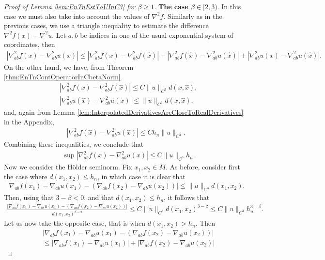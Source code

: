 \documentclass[11pt,reqno]{amsart}
\numberwithin{equation}{section}
\theoremstyle{plain}
\begin{document}
\begin{proof}[Proof of Lemma \ref{lem:EnTnEstToUInC3} for $\beta \geq 1$]
  \noindent \textbf{The case $\beta \in [2,3)$}. In this case we must also take into account the values of $\nabla^2f$. Similarly as in the previous cases, we use a triangle inequality to estimate the difference $\nabla^2 f(x)-\nabla^2 u$. Let $a,b$ be indices in one of the usual exponential system of coordinates, then
  \begin{align*}
    |\nabla_{ab}^2 f(x)-\nabla_{ab}^2 u(x)|\leq |\nabla_{ab}^2 f(x)-\nabla_{ab}^2 f(\hat x)|+|\nabla_{ab}^2 f(\hat x)-\nabla_{ab}^2 u(\hat x)|+|\nabla_{ab}^2 u(x)-\nabla_{ab}^2 u(\hat x)|.
  \end{align*}
  On the other hand, we have, from Theorem \ref{thm:EnTnContOperatorInCbetaNorm}
  \begin{align*}
    & |\nabla_{ab}^2 f(x)-\nabla_{ab}^2 f(\hat x)| \leq  C\|u\|_{C^3}d(x,\hat x),\\
    &  |\nabla_{ab}^2 u(\hat x) -\nabla_{ab}^2 u(x)| \leq \|u\|_{C^3}d(x,\hat x),
  \end{align*}
  and, again from Lemma \ref{lem:InterpolatedDerivativesAreCloseToRealDerivatives} in the Appendix, 
  \begin{align*}
    |\nabla_{ab}^2 f(\hat x)-\nabla_{ab}^2 u(\hat x)|\leq Ch_n\|u\|_{C^3}.
  \end{align*}  
  Combining these inequalities, we conclude that
  \begin{align*}
    & \sup |\nabla_{ab}^2 f(x)-\nabla_{ab}^2 u(x)|\leq C\|u\|_{C^3}h_n.
  \end{align*}
  Now we consider the H\"older seminorm. Fix $x_1,x_2\in M$. As before, consider first the case where $d(x_1,x_2)\leq h_n$, in which case it is clear that
  \begin{align*}
    |\nabla_{ab} f(x_1)-\nabla_{ab} u(x_1)-(\nabla_{ab} f(x_2)-\nabla_{ab} u(x_2))| \leq \|u\|_{C^3}d(x_1,x_2).
  \end{align*} 	  
  Then, using that $3-\beta<0$, and that $d(x_1,x_2) \leq h_n$, it follows that 
  \begin{align*}
    \frac{|\nabla_{ab} f(x_1)-\nabla_{ab} u(x_1)-(\nabla_{ab} f(x_2)-\nabla_{ab} u(x_2))|}{d(x_1,x_2)^{\beta-2}}  \leq C\|u\|_{C^3}d(x_1,x_2)^{3-\beta}\leq C\|u\|_{C^3}h_n^{3-\beta}.	 		
  \end{align*} 	  
  Let us now take the opposite case, that is when $d(x_1,x_2)>h_n$. Then
  \begin{align*}
    & |\nabla_{ab} f(x_1)-\nabla_{ab} u(x_1)-(\nabla_{ab} f(x_2)-\nabla_{ab} u(x_2))|\\
    & \leq |\nabla_{ab} f(x_1)-\nabla_{ab} u(x_1)|+|\nabla_{ab} f(x_2)-\nabla_{ab} u(x_2)| 

\end{align*}
\end{proof}
\end{document}
